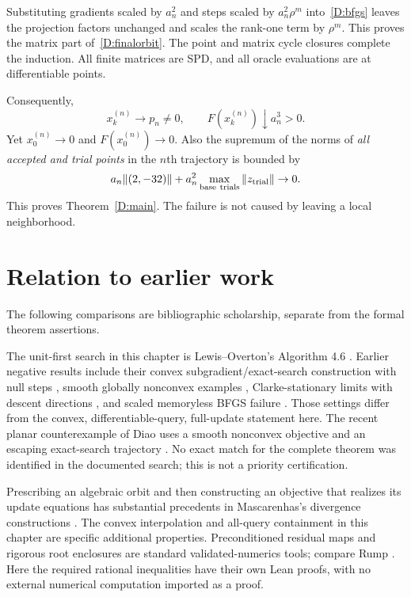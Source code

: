 Substituting gradients scaled by $a_n^2$ and steps scaled by $a_n^2\rho^m$ into~\eqref{D:bfgs} leaves the projection factors unchanged and scales the rank-one term by $\rho^m$. This proves the matrix part of~\eqref{D:finalorbit}. The point and matrix cycle closures complete the induction. All finite matrices are SPD, and all oracle evaluations are at differentiable points.

Consequently,
\[
 x_k^{(n)}\to p_n\ne0,\qquad
 F(x_k^{(n)})\downarrow a_n^3>0.
\]
Yet $x_0^{(n)}\to0$ and $F(x_0^{(n)})\to0$. Also the supremum of the norms of \emph{all accepted and trial points} in the $n$th trajectory is bounded by
\[
 a_n\|(2,-32)\|+a_n^2\max_{\rm base\ trials}\|z_{\rm trial}\|\to0.
\]
This proves Theorem~\ref{D:main}. The failure is not caused by leaving a local neighborhood.


\endgroup


\section*{Relation to earlier work}
The following comparisons are bibliographic scholarship, separate from the formal theorem assertions.

The unit-first search in this chapter is Lewis--Overton's Algorithm 4.6 \cite{LO}. Earlier negative results include their convex subgradient/exact-search construction with null steps \cite{NEG_LO08}, smooth globally nonconvex examples \cite{NEG_M04,NEG_M07,NEG_M14,NEG_DAI02,NEG_DAI13}, Clarke-stationary limits with descent directions \cite{NEG_LZ15}, and scaled memoryless BFGS failure \cite{NEG_AO21}. Those settings differ from the convex, differentiable-query, full-update statement here. The recent planar counterexample of Diao uses a smooth nonconvex objective and an escaping exact-search trajectory \cite{NEG_DIAO26}. No exact match for the complete theorem was identified in the documented search; this is not a priority certification.

Prescribing an algebraic orbit and then constructing an objective that realizes its update equations has substantial precedents in Mascarenhas's divergence constructions \cite{NEG_M04,NEG_M07,NEG_M14}. The convex interpolation and all-query containment in this chapter are specific additional properties. Preconditioned residual maps and rigorous root enclosures are standard validated-numerics tools; compare Rump \cite[Theorem 13.3]{NEG_RUMP10}. Here the required rational inequalities have their own Lean proofs, with no external numerical computation imported as a proof.
